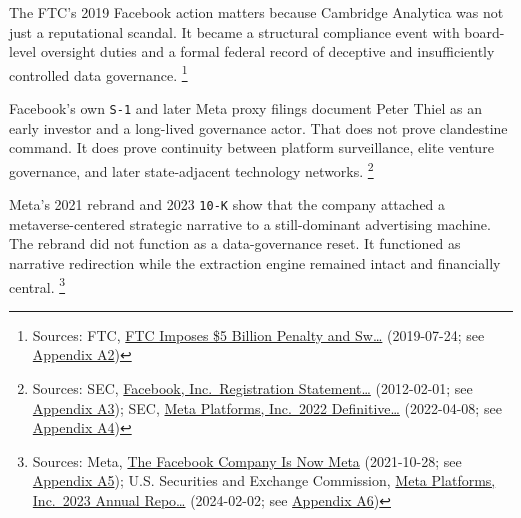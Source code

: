 \documentclass[
  american,
  11pt,
  letterpaper,
]{article}
\begin{document}
The FTC's 2019 Facebook action matters because Cambridge Analytica was
not just a reputational scandal. It became a structural compliance event
with board-level oversight duties and a formal federal record of
deceptive and insufficiently controlled data governance. \footnote{Sources:
  FTC,
  \href{https://www.ftc.gov/news-events/news/press-releases/2019/07/ftc-imposes-5-billion-penalty-sweeping-new-privacy-restrictions-facebook}{FTC
  Imposes \$5 Billion Penalty and Sw\ldots{}} (2019-07-24; see
  \hyperref[appendix-a2-ftc-imposes-5-billion-penalty-and-sweeping-new-privacy-restrictions-on-facebook]{Appendix
  A2})}

Facebook's own \texttt{S-1} and later Meta proxy filings document Peter
Thiel as an early investor and a long-lived governance actor. That does
not prove clandestine command. It does prove continuity between platform
surveillance, elite venture governance, and later state-adjacent
technology networks. \footnote{Sources: SEC,
  \href{https://www.sec.gov/Archives/edgar/data/1326801/000119312512034517/d287954ds1.htm}{Facebook,
  Inc.~Registration Statement\ldots{}} (2012-02-01; see
  \hyperref[appendix-a3-facebook-inc-registration-statement-on-form-s-1]{Appendix
  A3}); SEC,
  \href{https://www.sec.gov/Archives/edgar/data/1326801/000132680122000043/meta2022definitiveproxysta.htm}{Meta
  Platforms, Inc.~2022 Definitive\ldots{}} (2022-04-08; see
  \hyperref[appendix-a4-meta-platforms-inc-2022-definitive-proxy-statement]{Appendix
  A4})}

Meta's 2021 rebrand and 2023 \texttt{10-K} show that the company
attached a metaverse-centered strategic narrative to a still-dominant
advertising machine. The rebrand did not function as a data-governance
reset. It functioned as narrative redirection while the extraction
engine remained intact and financially central. \footnote{Sources: Meta,
  \href{https://about.fb.com/news/2021/10/facebook-company-is-now-meta/}{The
  Facebook Company Is Now Meta} (2021-10-28; see
  \hyperref[appendix-a5-the-facebook-company-is-now-meta]{Appendix A5});
  U.S. Securities and Exchange Commission,
  \href{https://www.sec.gov/Archives/edgar/data/1326801/000132680124000012/meta-20231231.htm}{Meta
  Platforms, Inc.~2023 Annual Repo\ldots{}} (2024-02-02; see
  \hyperref[appendix-a6-meta-platforms-inc-2023-annual-report-form-10-k]{Appendix
  A6})}
\end{document}
